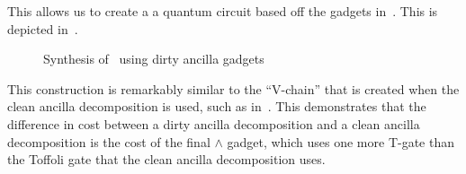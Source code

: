 This allows us to create a a quantum circuit based off the gadgets in~. This is depicted
in~. 

\begin{figure}[t]
  \centering
  \scalebox{1.0} {
    
  }
  \caption{Synthesis of~ using dirty ancilla gadgets}
  \label{fig-mct-gadgets}
\end{figure}

This construction is remarkably similar to the ``V-chain'' that is created when the clean ancilla 
decomposition is used, such as in~. This demonstrates that the difference in
cost between a dirty ancilla decomposition and a clean ancilla decomposition is the cost of the
final $\wedge$ gadget, which uses one more T-gate than the Toffoli gate that the clean ancilla
decomposition uses.




